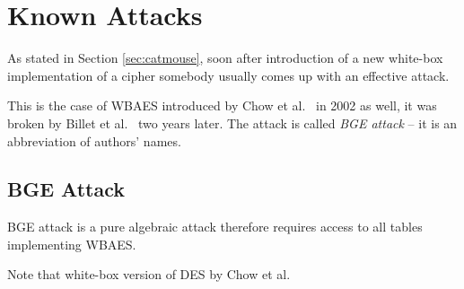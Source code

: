 \section{Known Attacks}
\label{sec:known}

As stated in Section \ref{sec:catmouse}, soon after introduction of a new white-box implementation of a cipher somebody usually comes up with an effective attack. %

This is the case of WBAES introduced by Chow et al.\ \cite{chow2003aes} in 2002 as well, it was broken by Billet et al.\ \cite{billet2005cryptanalysis} two years later. The attack is called {\em BGE attack} -- it is an abbreviation of authors' names.



\subsection{BGE Attack}

BGE attack is a pure algebraic attack therefore requires access to all tables implementing WBAES. %

Note that white-box version of DES by Chow et al.\ \cite{chow2003des} 

